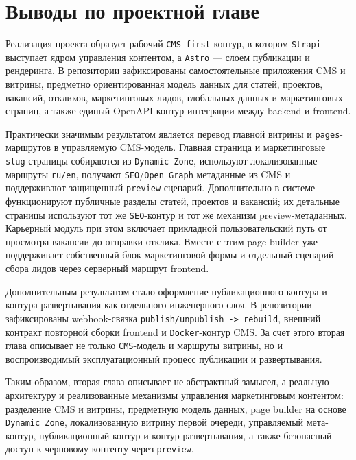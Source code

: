 \section{Выводы по проектной главе}

Реализация проекта образует рабочий \texttt{CMS-first} контур, в котором
\texttt{Strapi} выступает ядром управления контентом, а \texttt{Astro} --- слоем
публикации и рендеринга. В репозитории зафиксированы самостоятельные приложения CMS и
витрины, предметно ориентированная модель данных для статей, проектов, вакансий,
откликов, маркетинговых лидов, глобальных данных и маркетинговых страниц, а также единый
OpenAPI-контур интеграции между backend и frontend.

Практически значимым результатом является перевод главной витрины и
\texttt{pages}-маршрутов в управляемую CMS-модель. Главная страница и маркетинговые
\texttt{slug}-страницы собираются из \texttt{Dynamic Zone}, используют локализованные
маршруты \texttt{ru/en}, получают \texttt{SEO}/\texttt{Open Graph} метаданные из CMS и
поддерживают защищенный \texttt{preview}-сценарий. Дополнительно в системе
функционируют публичные разделы статей, проектов и вакансий; их детальные страницы
используют тот же \texttt{SEO}-контур и тот же механизм preview-метаданных. Карьерный
модуль при этом включает прикладной пользовательский путь от просмотра вакансии до
отправки отклика. Вместе с этим page builder уже поддерживает собственный блок
маркетинговой формы и отдельный сценарий сбора лидов через серверный маршрут frontend.

Дополнительным результатом стало оформление публикационного контура и контура
развертывания как отдельного инженерного слоя. В репозитории зафиксированы
webhook-связка \texttt{publish/unpublish -> rebuild}, внешний контракт повторной сборки
frontend и \texttt{Docker}-контур CMS. За счет этого вторая глава описывает не только
\texttt{CMS}-модель и маршруты витрины, но и воспроизводимый эксплуатационный процесс
публикации и развертывания.

Таким образом, вторая глава описывает не абстрактный замысел, а реальную
архитектуру и реализованные механизмы управления маркетинговым контентом: разделение CMS и
витрины, предметную модель данных, page builder на основе \texttt{Dynamic Zone},
локализованную витрину первой очереди, управляемый мета-контур, публикационный контур и
контур развертывания, а также безопасный доступ к черновому контенту через
\texttt{preview}.
